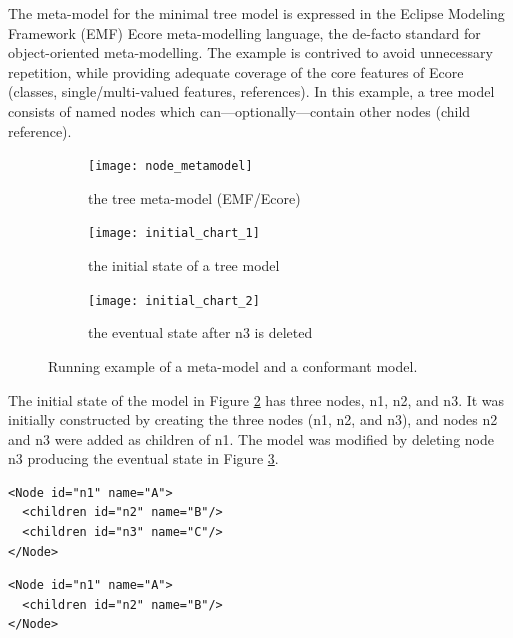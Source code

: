 The meta-model for the minimal tree model is expressed in the Eclipse Modeling Framework (EMF) Ecore meta-modelling language, the de-facto standard for object-oriented meta-modelling. The example is contrived to avoid unnecessary repetition, while providing adequate coverage of the core features of Ecore (classes, single/multi-valued features, references).
In this example, a tree model consists of named nodes which can—optionally—contain other nodes (\textsf{child} reference).

\begin{figure}[ht]
  \begin{subfigure}[t]{0.32\linewidth}
    \centering
    \texttt{[image: node\_metamodel]}
    \caption{the tree meta-model (EMF/Ecore)}
    \label{fig:tree_metamodel}
  \end{subfigure}
  \hfill
  \begin{subfigure}[t]{0.32\linewidth}
    \centering
    \texttt{[image: initial\_chart\_1]}
    \caption{the initial state of a tree model}
    \label{fig:initial_model}
  \end{subfigure}
  \hfill
  \begin{subfigure}[t]{0.32\linewidth}
    \centering
    \texttt{[image: initial\_chart\_2]}
    \caption{the eventual state after \textsf{n3} is deleted}
    \label{fig:modified_model}
  \end{subfigure}
  \caption{Running example of a meta-model and a conformant model.}
  \label{fig:tree_example}
\end{figure}

The initial state of the model in Figure \ref{fig:initial_model} has three nodes, \textsf{n1}, \textsf{n2}, and \textsf{n3}. It was initially constructed by creating the three nodes (\textsf{n1}, \textsf{n2}, and \textsf{n3}), and nodes \textsf{n2} and \textsf{n3} were added as children of \textsf{n1}. The model was modified by deleting node \textsf{n3} producing the eventual state in Figure \ref{fig:modified_model}.

\vspace{-20pt}
\begin{minipage}[t]{0.49\linewidth}
\begin{lstlisting}[style=xmi,caption={State-based representation in simplified XMI of the tree model in Figure \ref{fig:initial_model}.},label=lst:xmimodel_0]
<Node id="n1" name="A">
  <children id="n2" name="B"/>
  <children id="n3" name="C"/>
</Node>
\end{lstlisting}
\end{minipage}
\hfill
\begin{minipage}[t]{0.49\linewidth}
\begin{lstlisting}[style=xmi,caption={State-based representation in simplified XMI of the tree model in Figure \ref{fig:modified_model}.},label=lst:xmimodel]
<Node id="n1" name="A">
  <children id="n2" name="B"/>
</Node>
\end{lstlisting}
\end{minipage}

